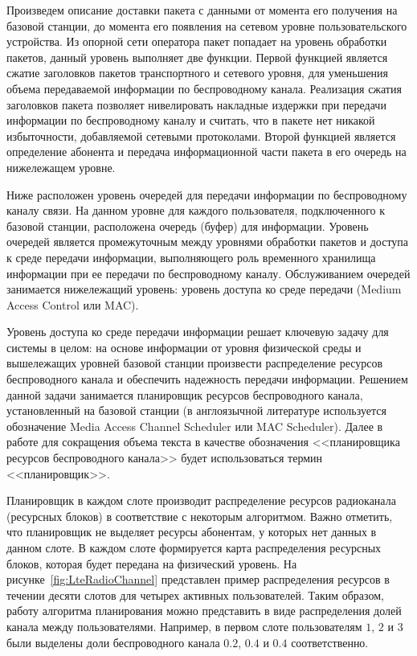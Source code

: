 Произведем описание доставки пакета с данными от момента его получения на базовой станции, до момента его появления на сетевом уровне пользовательского устройства. Из опорной сети оператора пакет попадает на уровень обработки пакетов, данный уровень выполняет две функции. Первой функцией является сжатие заголовков пакетов транспортного и сетевого уровня, для уменьшения объема передаваемой информации по беспроводному канала. Реализация сжатия заголовков пакета позволяет нивелировать накладные издержки при передачи информации по беспроводному каналу и считать, что в пакете нет никакой избыточности, добавляемой сетевыми протоколами. Второй функцией является определение абонента и передача информационной части пакета в его очередь на нижележащем уровне.

Ниже расположен уровень очередей для передачи информации по беспроводному каналу связи. На данном уровне для каждого пользователя, подключенного к базовой станции, расположена очередь (буфер) для информации. Уровень очередей является промежуточным между уровнями обработки пакетов и доступа к среде передачи информации, выполняющего роль временного хранилища информации при ее передачи по беспроводному каналу. Обслуживанием очередей занимается нижележащий уровень: уровень доступа ко среде передачи (Medium Access Control или MAC).

Уровень доступа ко среде передачи информации решает ключевую задачу для системы в целом: на основе информации от уровня физической среды и вышележащих уровней базовой станции произвести распределение ресурсов беспроводного канала и обеспечить надежность передачи информации. Решением данной задачи занимается планировщик ресурсов беспроводного канала, установленный на базовой станции (в англоязычной литературе используется обозначение Media Access Channel Scheduler или MAC Scheduler). Далее в работе для сокращения объема текста в качестве обозначения <<планировщика ресурсов беспроводного канала>> будет использоваться термин <<планировщик>>.

Планировщик в каждом слоте производит распределение ресурсов радиоканала (ресурсных блоков) в соответствие с некоторым алгоритмом. Важно отметить, что планировщик не выделяет ресурсы абонентам, у которых нет данных в данном слоте. В каждом слоте формируется карта распределения ресурсных блоков, которая будет передана на физический уровень. На рисунке~\ref{fig:LteRadioChannel} представлен пример распределения ресурсов в течении десяти слотов для четырех активных пользователей. Таким образом, работу алгоритма планирования можно представить в виде распределения долей канала между пользователями. Например, в первом слоте пользователям $1$, $2$ и $3$ были выделены доли беспроводного канала $0.2$, $0.4$ и $0.4$ соответственно.

